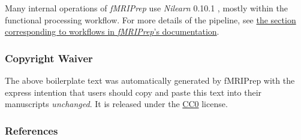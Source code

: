 \documentclass[
]{article}
\begin{document}
Many internal operations of \emph{fMRIPrep} use \emph{Nilearn} 0.10.1
\citep[RRID:SCR\_001362]{nilearn}, mostly within the functional
processing workflow. For more details of the pipeline, see
\href{https://fmriprep.readthedocs.io/en/latest/workflows.html}{the
section corresponding to workflows in \emph{fMRIPrep}'s documentation}.

\hypertarget{copyright-waiver}{%
\subsubsection{Copyright Waiver}\label{copyright-waiver}}

The above boilerplate text was automatically generated by fMRIPrep with
the express intention that users should copy and paste this text into
their manuscripts \emph{unchanged}. It is released under the
\href{https://creativecommons.org/publicdomain/zero/1.0/}{CC0} license.

\hypertarget{references}{%
\subsubsection{References}\label{references}}

  
\end{document}
